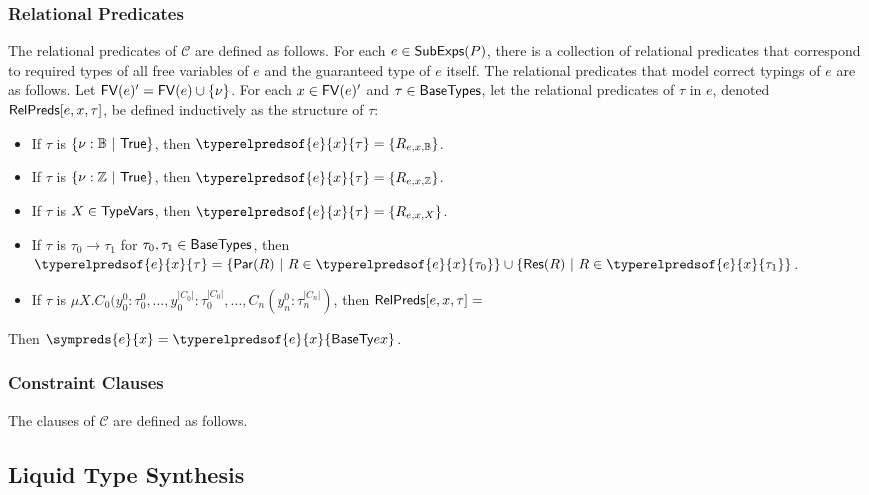 \subsubsection{Relational Predicates}
\label{s:rel-preds}
The relational predicates of $\mathcal{C}$ are defined as follows.
%
For each $e \in \mathsf{SubExps}(P)$, there is a collection of relational
predicates that correspond to required types of all free variables of
$e$ and the guaranteed type of $e$ itself.
%
The relational predicates that model correct typings of $e$ are as
follows.
%
Let $\mathsf{FV}(e)' = \mathsf{FV}(e) \cup \{ \nu \}$.
%
For each $x \in \mathsf{FV}(e)'$ and $\tau \in \mathsf{BaseTypes}$,
%
%
let the relational predicates of $\tau$ in $e$, denoted
$\mathsf{RelPreds}[ e, x, \tau ]$, be defined inductively as the structure of
$\tau$:
\begin{itemize}
\item
  If $\tau$ is $\{ \nu : \mathbb{B}\ |\  \mathsf{True}  \}$, then
  $\typerelpredsof{ e }{ x }{ \tau } = \elts{ \relpredof{ e }{ x }{
      \bools } }$.
\item
  If $\tau$ is $\{ \nu : \mathbb{Z}\ |\  \mathsf{True}  \}$, then
  $\typerelpredsof{ e }{ x }{ \tau } = \elts{ \relpredof{ e }{ x }{
      \ints } }$.
\item
  If $\tau$ is $X \in \mathsf{TypeVars}$, then $\typerelpredsof{ e }{ x }{
    \tau } = \elts{ \relpredof{ e }{ x }{ X } }$.
\item
  If $\tau$ is $\tau_0 \to \tau_1$ for $\tau_0, \tau_1 \in
  \mathsf{BaseTypes}$, then $\typerelpredsof{ e }{ x }{ \tau } =
  \setformer{ \paramrelcons(R) }{ R \in \typerelpredsof{ e }{ x }{
      \tau_0 } } %
  \union \setformer{ \resrelcons(R) }{ R \in
    \typerelpredsof{e}{x}{\tau_1} }$.
\item 
  If $\tau$ is $\mu X. C_0(y_0^0 : \tau_0^0, \ldots, y_0^{|C_0|} :
  \tau_0^{|C_0|}, \ldots, C_n(y_n^0 : \tau_n^{|C_n|})$, then
  $\mathsf{RelPreds}[  e ,  x ,  \tau  ] = $
\end{itemize}
%
Then $\sympreds{ e }{ x } = \typerelpredsof{ e }{ x }{ \basetype{ e }{
    x } }$.
%

\subsubsection{Constraint Clauses}
\label{s:clauses}
The clauses of $\mathcal{C}$ are defined as follows.

%

%
\subsection{Liquid Type Synthesis}
\label{s:liquid-type-syn}
